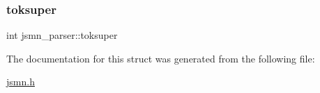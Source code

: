 \mbox{\label{structjsmn__parser_af11fcec48d9f1298909777a12f1d1e39}} 
\subsubsection{\texorpdfstring{toksuper}{toksuper}}
{\footnotesize\ttfamily int jsmn\+\_\+parser\+::toksuper}



The documentation for this struct was generated from the following file\+:\begin{DoxyCompactItemize}
\item 
\hyperlink{jsmn_8h}{jsmn.\+h}\end{DoxyCompactItemize}

